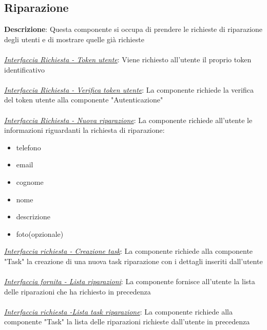 \documentclass{report}
\begin{document}
\subsection*{Riparazione}
\textbf{Descrizione}: Questa componente si occupa di prendere le richieste di riparazione degli utenti e di mostrare quelle già richieste\\\\
\uline{\textit{Interfaccia Richiesta - Token utente}}: 
Viene richiesto all'utente il proprio token identificativo\\\\
\uline{\textit{Interfaccia Richiesta - Verifica token utente}}:
La componente richiede la verifica del token utente alla componente "Autenticazione"\\\\
\uline{\textit{Interfaccia Richiesta - Nuova riparazione}}:
La componente richiede all'utente le informazioni riguardanti la richiesta di riparazione:
\begin{itemize}
	\item telefono
	\item email
	\item cognome
	\item nome
	\item descrizione
	\item foto(opzionale)
\end{itemize}
\uline{\textit{Interfaccia richiesta - Creazione task}}: 
La componente richiede alla componente "Task" la creazione di una nuova task riparazione con i dettagli inseriti dall'utente\\\\
\uline{\textit{Interfaccia fornita - Lista riparazioni}}: 
La componente fornisce all'utente la lista delle riparazioni che ha richiesto in precedenza\\\\
\uline{\textit{Interfaccia richiesta -Lista task riparazione}}: 
La componente richiede alla componente "Task" la lista delle riparazioni richieste dall'utente in precedenza
\end{document}
